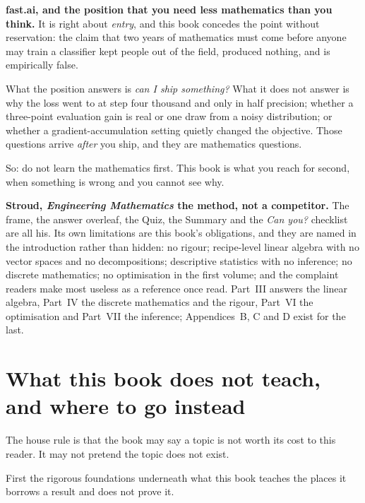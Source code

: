 \medskip
\textbf{fast.ai, and the position that you need less mathematics than you
think.} It is right about \emph{entry}, and this book concedes the point
without reservation: the claim that two years of mathematics must come before
anyone may train a classifier kept people out of the field, produced nothing,
and is empirically false.

What the position answers is \emph{can I ship something?} What it does not
answer is why the loss went to  at step four thousand and only in
half precision; whether a three-point evaluation gain is real or one draw from
a noisy distribution; or whether a gradient-accumulation setting quietly changed
the objective. Those questions arrive \emph{after} you ship, and they are
mathematics questions.

So: do not learn the mathematics first. This book is what you reach for second,
when something is wrong and you cannot see why.

\medskip
\textbf{Stroud, \emph{Engineering Mathematics} \dash{} the method, not a
competitor.} The frame, the answer overleaf, the Quiz, the Summary and the
\emph{Can you?} checklist are all his. Its own limitations are this book's
obligations, and they are named in the introduction rather than hidden:
no rigour; recipe-level linear algebra with no vector spaces and no
decompositions; descriptive statistics with no inference; no discrete
mathematics; no optimisation in the first volume; and \dash{} the complaint
readers make most \dash{} useless as a reference once read. Part~III answers
the linear algebra, Part~IV the discrete mathematics and the rigour, Part~VI
the optimisation and Part~VII the inference; Appendices~B, C and D exist for
the last.

\section{What this book does not teach, and where to go instead}
\label{sec:E-not}

The house rule is that the book may say a topic is not worth its cost to this
reader. It may not pretend the topic does not exist.

First the rigorous foundations underneath what this book teaches \dash{} the
places it borrows a result and does not prove it.

